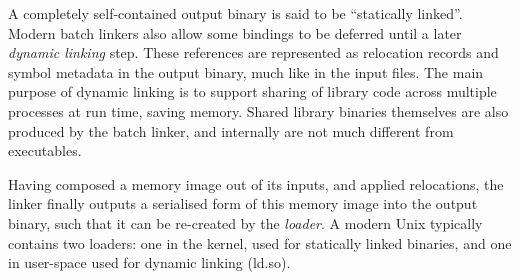 
A completely self-contained output binary is said to be ``statically linked''. 
Modern batch linkers also allow some bindings to be deferred until a later \emph{dynamic linking} step.
These references are represented as relocation records and symbol metadata
in the output binary, much like in the input files.
The main purpose of dynamic linking is to support sharing of library code across multiple processes at run time, saving memory.
Shared library binaries themselves are also produced by the batch linker,
and internally are not much different from executables.

Having composed a memory image out of its inputs, and applied relocations, 
the linker finally outputs a serialised form of this memory image
into the output binary, such that it can be re-created by the \emph{loader}.
A modern Unix typically contains two loaders: 
one in the kernel, used for statically linked binaries, and one in user-space used for dynamic linking (\textsf{ld.so}).





